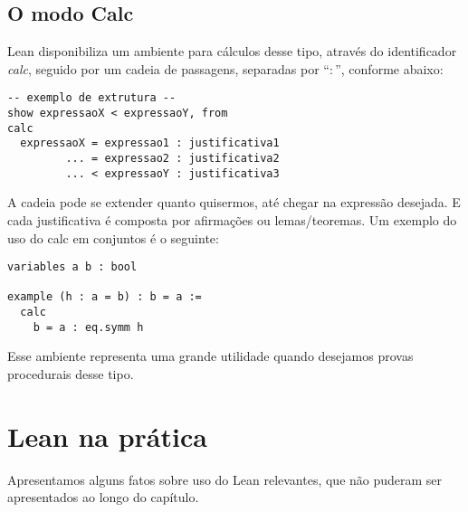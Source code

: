 

\subsection{O modo Calc}
Lean disponibiliza um ambiente para cálculos desse tipo, através do identificador \textit{calc}, seguido por um cadeia de passagens, separadas por ``$:$'', conforme abaixo:

\vspace{5mm}
\begin{lstlisting}
-- exemplo de extrutura --
show expressaoX < expressaoY, from
calc
  expressaoX = expressao1 : justificativa1
         ... = expressao2 : justificativa2
         ... < expressaoY : justificativa3
\end{lstlisting}
\vspace{5mm}

\noindent A cadeia pode se extender quanto quisermos, até chegar na expressão desejada. E cada justificativa é composta por afirmações ou lemas/teoremas. Um exemplo do uso do {\selectfont calc} em conjuntos é o seguinte:

\vspace{5mm}
\begin{lstlisting}
variables a b : bool

example (h : a = b) : b = a :=
  calc
    b = a : eq.symm h
\end{lstlisting}
\vspace{5mm}

\noindent Esse ambiente representa uma grande utilidade quando desejamos provas procedurais desse tipo.

\section{Lean na prática}
Apresentamos alguns fatos sobre uso do Lean relevantes, que não puderam ser apresentados ao longo do capítulo.

